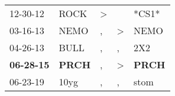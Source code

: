 \begin{supertabular}{p{0.07\textwidth}p{0.06\textwidth}p{0.02\textwidth}p{0.02\textwidth}p{0.06\textwidth}}
          12-30-12\textsuperscript{} &           ROCK\textsuperscript{} &  \textgreater &               &                            *CS1* \\
          03-16-13\textsuperscript{} &           NEMO\textsuperscript{} &             , &  \textgreater &           NEMO\textsuperscript{} \\
          04-26-13\textsuperscript{} &           BULL\textsuperscript{} &             , &             , &            2X2\textsuperscript{} \\
 \textbf{06-28-15\textsuperscript{}} &  \textbf{PRCH\textsuperscript{}} &             , &  \textgreater &  \textbf{PRCH\textsuperscript{}} \\
          06-23-19\textsuperscript{} &           10yg\textsuperscript{} &             , &             , &           stom\textsuperscript{} \\
\end{supertabular}
